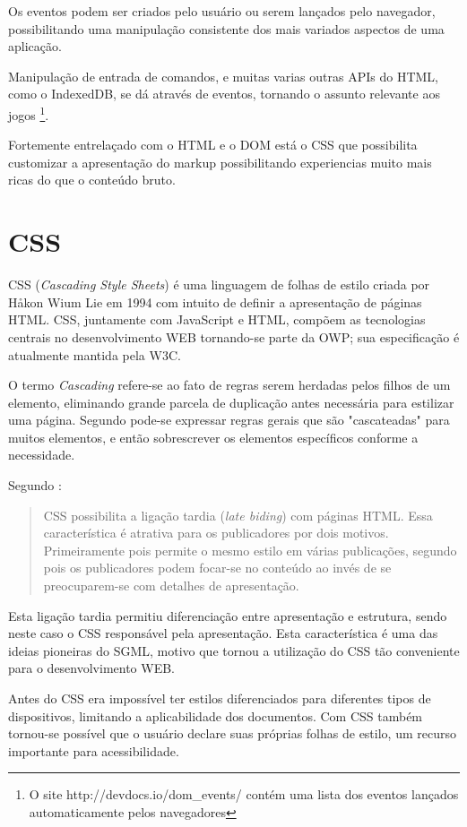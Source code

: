 Os eventos podem ser criados pelo usuário ou serem lançados pelo
navegador, possibilitando uma manipulação consistente dos mais
variados aspectos de uma aplicação.

Manipulação de entrada de comandos, e muitas varias outras APIs do
HTML, como o IndexedDB, se dá através de eventos, tornando o assunto
relevante aos jogos \footnote{O site http://devdocs.io/dom\_events/
contém uma lista dos eventos lançados automaticamente pelos
navegadores}.

Fortemente entrelaçado com o HTML e o DOM está o CSS que possibilita
customizar a apresentação do markup possibilitando experiencias muito
mais ricas do que o conteúdo bruto.
\section{CSS}
CSS (\textit{Cascading Style Sheets}) é uma linguagem de folhas de
estilo criada por Håkon Wium Lie em 1994 com intuito de definir a
apresentação de páginas HTML. CSS, juntamente com JavaScript e HTML,
compõem as tecnologias centrais no desenvolvimento WEB tornando-se
parte da OWP; sua especificação é atualmente mantida pela W3C.

O termo \textit{Cascading} refere-se ao fato de regras serem
herdadas pelos filhos de um elemento, eliminando grande parcela de
duplicação antes necessária para estilizar uma página. Segundo
\cite{html5mostwanted} pode-se expressar regras gerais que são
"cascateadas" para muitos elementos, e então sobrescrever os elementos
específicos conforme a necessidade.

Segundo \cite[pp. 23--24]{CascadingStyleSheets}:
\begin{quote}
CSS possibilita a ligação tardia (\textit{late biding}) com
páginas HTML. Essa característica é atrativa para os publicadores
por dois motivos. Primeiramente pois permite o mesmo estilo em várias
publicações, segundo pois os publicadores podem focar-se no conteúdo
ao invés de se preocuparem-se com detalhes de apresentação.
\end{quote}

Esta ligação tardia permitiu diferenciação entre apresentação e
estrutura, sendo neste caso o CSS responsável pela apresentação. Esta
característica é uma das ideias pioneiras do SGML, motivo que tornou a
utilização do CSS tão conveniente para o desenvolvimento WEB.

Antes do CSS era impossível ter estilos diferenciados para diferentes
tipos de dispositivos, limitando a aplicabilidade dos documentos.
Com CSS também tornou-se possível que o usuário declare suas próprias
folhas de estilo, um recurso importante para acessibilidade.

